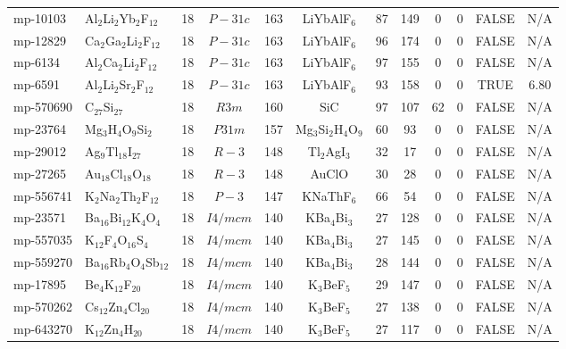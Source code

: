 {\begin{longtable}{llcccccccccc}
    mp-10103 & Al$_{2}$Li$_{2}$Yb$_{2}$F$_{12}$ & 18    & $P-31c$ & 163   & LiYbAlF$_{6}$ & 87    & 149   & 0     & 0     & FALSE & N/A \\
    mp-12829 & Ca$_{2}$Ga$_{2}$Li$_{2}$F$_{12}$ & 18    & $P-31c$ & 163   & LiYbAlF$_{6}$ & 96    & 174   & 0     & 0     & FALSE & N/A \\
    mp-6134 & Al$_{2}$Ca$_{2}$Li$_{2}$F$_{12}$ & 18    & $P-31c$ & 163   & LiYbAlF$_{6}$ & 97    & 155   & 0     & 0     & FALSE & N/A \\
    mp-6591 & Al$_{2}$Li$_{2}$Sr$_{2}$F$_{12}$ & 18    & $P-31c$ & 163   & LiYbAlF$_{6}$ & 93    & 158   & 0     & 0     & TRUE  & 6.80  \\
    mp-570690 & C$_{27}$Si$_{27}$ & 18    & $R3m$ & 160   & SiC   & 97    & 107   & 62    & 0     & FALSE & N/A \\
    mp-23764 & Mg$_{3}$H$_{4}$O$_{9}$Si$_{2}$ & 18    & $P31m$ & 157   & Mg$_{3}$Si$_{2}$H$_{4}$O$_{9}$ & 60    & 93    & 0     & 0     & FALSE & N/A \\
    mp-29012 & Ag$_{9}$Tl$_{18}$I$_{27}$ & 18    & $R-3$ & 148   & Tl$_{2}$AgI$_{3}$ & 32    & 17    & 0     & 0     & FALSE & N/A \\
    mp-27265 & Au$_{18}$Cl$_{18}$O$_{18}$ & 18    & $R-3$ & 148   & AuClO & 30    & 28    & 0     & 0     & FALSE & N/A \\
    mp-556741 & K$_{2}$Na$_{2}$Th$_{2}$F$_{12}$ & 18    & $P-3$ & 147   & KNaThF$_{6}$ & 66    & 54    & 0     & 0     & FALSE & N/A \\
    mp-23571 & Ba$_{16}$Bi$_{12}$K$_{4}$O$_{4}$ & 18    & $I4/mcm$ & 140   & KBa$_{4}$Bi$_{3}$ & 27    & 128   & 0     & 0     & FALSE & N/A \\
    mp-557035 & K$_{12}$F$_{4}$O$_{16}$S$_{4}$ & 18    & $I4/mcm$ & 140   & KBa$_{4}$Bi$_{3}$ & 27    & 145   & 0     & 0     & FALSE & N/A \\
    mp-559270 & Ba$_{16}$Rb$_{4}$O$_{4}$Sb$_{12}$ & 18    & $I4/mcm$ & 140   & KBa$_{4}$Bi$_{3}$ & 28    & 144   & 0     & 0     & FALSE & N/A \\
    mp-17895 & Be$_{4}$K$_{12}$F$_{20}$ & 18    & $I4/mcm$ & 140   & K$_{3}$BeF$_{5}$ & 29    & 147   & 0     & 0     & FALSE & N/A \\
    mp-570262 & Cs$_{12}$Zn$_{4}$Cl$_{20}$ & 18    & $I4/mcm$ & 140   & K$_{3}$BeF$_{5}$ & 27    & 138   & 0     & 0     & FALSE & N/A \\
    mp-643270 & K$_{12}$Zn$_{4}$H$_{20}$ & 18    & $I4/mcm$ & 140   & K$_{3}$BeF$_{5}$ & 27    & 117   & 0     & 0     & FALSE & N/A \\

\end{longtable}}
